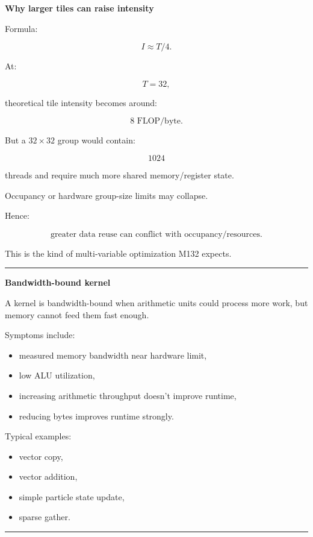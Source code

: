 \textbf{Why larger tiles can raise intensity}

Formula:

\[
I\approx T/4.
\]

At:

\[
T=32,
\]

theoretical tile intensity becomes around:

\[
8\text{ FLOP/byte}.
\]

But a \(32\times32\) group would contain:

\[
1024
\]

threads and require much more shared memory/register state.

Occupancy or hardware group-size limits may collapse.

Hence:

\[
\boxed{
\text{greater data reuse can conflict with occupancy/resources}.
}
\]

This is the kind of multi-variable optimization M132 expects.

\begin{center}\rule{0.5\linewidth}{0.5pt}\end{center}

\textbf{Bandwidth-bound kernel}

A kernel is bandwidth-bound when arithmetic units could process more work, but memory cannot feed them fast enough.

Symptoms include:

\begin{itemize}
\tightlist
\item
  measured memory bandwidth near hardware limit,
\item
  low ALU utilization,
\item
  increasing arithmetic throughput doesn't improve runtime,
\item
  reducing bytes improves runtime strongly.
\end{itemize}

Typical examples:

\begin{itemize}
\tightlist
\item
  vector copy,
\item
  vector addition,
\item
  simple particle state update,
\item
  sparse gather.
\end{itemize}

\begin{center}\rule{0.5\linewidth}{0.5pt}\end{center}

